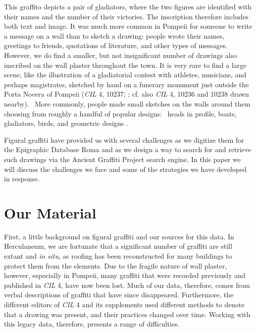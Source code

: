 \documentclass[amsthm,ebook]{saparticle}
\begin{document}
This graffito depicts a pair of gladiators, where the two figures are identified with their names and the number of
their victories. The inscription therefore includes both text and image. It was much more common in Pompeii for someone
to write a message on a wall than to sketch a drawing: people wrote their names, greetings to friends, quotations of
literature, and other types of messages. However, we do find a smaller, but not insignificant number of drawings also
inscribed on the wall plaster throughout the town. It is very rare to find a large scene, like the illustration of a
gladiatorial contest with athletes, musicians, and perhaps magistrates, sketched by hand on a funerary monument just
outside the Porta Nocera of Pompeii (\emph{CIL} 4, 10237; \citet[D31]{cooley_pompeii_2013}; cf. also \emph{CIL} 4, 10236 and 10238 drawn
nearby). \ More commonly, people made small sketches on the walls around them choosing from roughly a handful of
popular designs: \ heads in profile, boats, gladiators, birds, and geometric designs \citep{langner_antike_2001}.




Figural graffiti have provided us with several challenges as we digitize them for the Epigraphic Database Roma and as we
design a way to search for and retrieve such drawings via the Ancient Graffiti Project search engine. In this paper we
will discuss the challenges we face and some of the strategies we have developed in response. 




\section{Our Material}
 

\noindent First, a little background on figural graffiti and our sources for this data. In Herculaneum, we are fortunate that a
significant number of graffiti are still extant and \emph{in situ}, as roofing has been reconstructed for many buildings to
protect them from the elements. Due to the fragile nature of wall plaster, however, especially in Pompeii, many
graffiti that were recorded previously and published in \emph{CIL} 4, have now been lost. Much of our data, therefore, comes
from verbal descriptions of graffiti that have since disappeared. Furthermore, the different editors of \emph{CIL} 4 and its
supplements used different methods to denote that a drawing was present, and their practices changed over time. Working
with this legacy data, therefore, presents a range of difficulties. 
\end{document}
